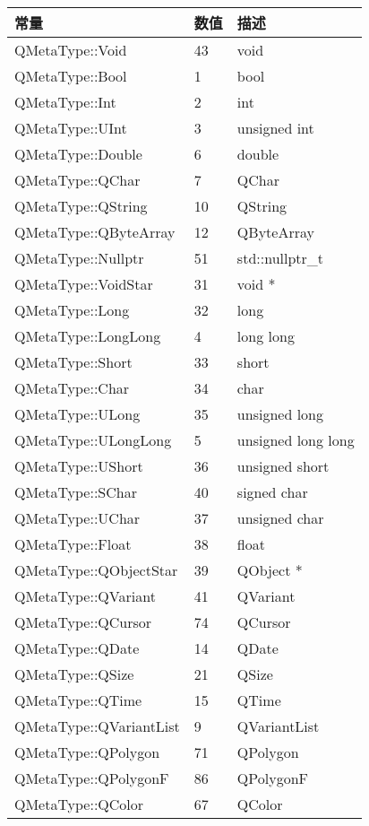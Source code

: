 \begin{longtable}{|l|l|m{20em}|}   
\hline
常量 &	数值 &	描述 \\ 
\hline
QMetaType::Void &	43&	void \\
\hline
QMetaType::Bool	&1&	bool \\
\hline
QMetaType::Int	&2&	int \\
\hline
QMetaType::UInt	&3	&unsigned int \\
\hline
QMetaType::Double&	6	&double \\
\hline
QMetaType::QChar&	7	&QChar \\
\hline
QMetaType::QString	&10&	QString \\
\hline
QMetaType::QByteArray&	12&	QByteArray \\
\hline
QMetaType::Nullptr&	51&	std::nullptr\_t \\
\hline
QMetaType::VoidStar	&31&	void * \\
\hline
QMetaType::Long	&32	&long \\
\hline
QMetaType::LongLong	&4	&long long \\
\hline
QMetaType::Short	&33&	short \\
\hline
QMetaType::Char&	34	&char \\
\hline
QMetaType::ULong	&35	&unsigned long \\
\hline
QMetaType::ULongLong&	5	&unsigned long long \\
\hline
QMetaType::UShort&	36&	unsigned short \\
\hline
QMetaType::SChar&	40&	signed char \\
\hline
QMetaType::UChar&	37&	unsigned char \\
\hline
QMetaType::Float	&38&	float \\
\hline
QMetaType::QObjectStar	&39&	QObject * \\
\hline
QMetaType::QVariant	&41	&QVariant \\
\hline
QMetaType::QCursor	&74&	QCursor \\
\hline
QMetaType::QDate&	14	&QDate \\
\hline
QMetaType::QSize&	21&	QSize \\
\hline
QMetaType::QTime&	15	&QTime\\
\hline
QMetaType::QVariantList&	9	&QVariantList\\
\hline
QMetaType::QPolygon&	71	&QPolygon\\
\hline
QMetaType::QPolygonF&	86&	QPolygonF\\
\hline
QMetaType::QColor	&67&	QColor\\

\end{longtable}
